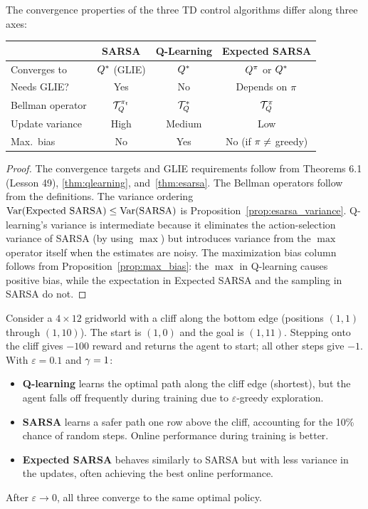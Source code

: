 \documentclass[11pt,a4paper]{article}
\begin{document}
\begin{proposition}
\label{prop:comparison}
The convergence properties of the three TD control algorithms differ
along three axes:
\begin{center}
\begin{tabular}{lccc}
\toprule
& \textbf{SARSA} & \textbf{Q-Learning} & \textbf{Expected SARSA} \\
\midrule
Converges to & $Q^*$ (GLIE) & $Q^*$ & $Q^{\pi}$ or $Q^*$ \\
Needs GLIE? & Yes & No & Depends on $\pi$ \\
Bellman operator & $\mathcal{T}^{\pi_t}_Q$ & $\mathcal{T}^*_Q$
  & $\mathcal{T}^\pi_Q$ \\
Update variance & High & Medium & Low \\
Max.\ bias & No & Yes & No (if $\pi \neq$ greedy) \\
\bottomrule
\end{tabular}
\end{center}
\end{proposition}

\begin{proof}
The convergence targets and GLIE requirements follow from
Theorems 6.1 (Lesson 49), \ref{thm:qlearning},
and~\ref{thm:esarsa}. The Bellman operators follow from the
definitions. The variance ordering
$\operatorname{Var}(\text{Expected SARSA}) \leq \operatorname{Var}(\text{SARSA})$ is
Proposition~\ref{prop:esarsa_variance}. Q-learning's variance is
intermediate because it eliminates the action-selection variance
of SARSA (by using $\max$) but introduces variance from the
$\max$ operator itself when the estimates are noisy. The
maximization bias column follows from
Proposition~\ref{prop:max_bias}: the $\max$ in Q-learning causes
positive bias, while the expectation in Expected SARSA and the
sampling in SARSA do not.
\end{proof}

\begin{example}
\label{ex:cliff}
Consider a $4 \times 12$ gridworld with a cliff along the bottom
edge (positions $(1,1)$ through $(1,10)$). The start is $(1,0)$
and the goal is $(1,11)$. Stepping onto the cliff gives $-100$
reward and returns the agent to start; all other steps give $-1$.
With $\varepsilon = 0.1$ and $\gamma = 1$:
\begin{itemize}[nosep]
  \item \textbf{Q-learning} learns the optimal path along the
    cliff edge (shortest), but the agent falls off frequently
    during training due to $\varepsilon$-greedy exploration.
  \item \textbf{SARSA} learns a safer path one row above the
    cliff, accounting for the 10\% chance of random steps.
    Online performance during training is better.
  \item \textbf{Expected SARSA} behaves similarly to SARSA
    but with less variance in the updates, often achieving
    the best online performance.
\end{itemize}
After $\varepsilon \to 0$, all three converge to the same
optimal policy.
\end{example}
\end{document}
